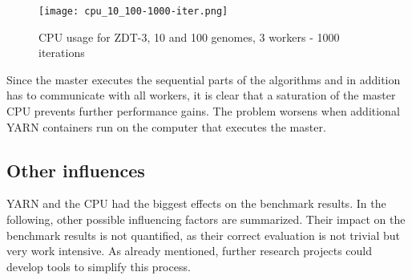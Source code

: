 \begin{figure}
  \centering
  \texttt{[image: cpu\_10\_100-1000-iter.png]}
  \caption[CPU usage for ZDT-3, 10 and 100 genomes, 3 workers]{CPU usage for ZDT-3, 10 and 100 genomes, 3 workers - 1000 iterations}
  \label{fig:cpu_10_100-1000-iter}
\end{figure}

Since the master executes the sequential parts of the algorithms and in addition has to communicate with all workers, it is clear that a saturation of the master CPU prevents further performance gains. The problem worsens when additional YARN containers run on the computer that executes the master.

\subsection{Other influences}
\label{chap:evaluation:influence-other}
YARN and the CPU had the biggest effects on the benchmark results. In the following, other possible influencing factors are summarized. Their impact on the benchmark results is not quantified, as their correct evaluation is not trivial but very work intensive. As already mentioned, further research projects could develop tools to simplify this process.

